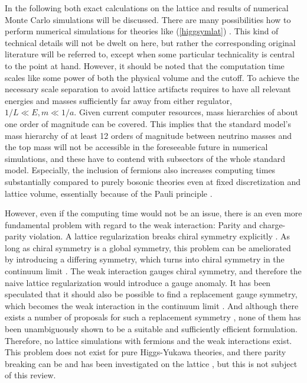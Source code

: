 \documentclass[final,twoside,12pt]{article}
\newcommand*{\pref}[1]{(\ref{#1})}
\newcommand*{\1}{1\!\!\!\bot}
\begin{document}
In the following both exact calculations on the lattice and results of numerical Monte Carlo simulations will be discussed. There are many possibilities how to perform numerical simulations for theories like \pref{higgsymlat} \cite{Montvay:1994cy,DeGrand:2006zz}. This kind of technical details will not be dwelt on here, but rather the corresponding original literature will be referred to, except when some particular technicality is central to the point at hand. However, it should be noted that the computation time scales like some power of both the physical volume and the cutoff. To achieve the necessary scale separation to avoid lattice artifacts requires to have all relevant energies and masses sufficiently far away from either regulator, $1/L\ll E,m\ll 1/a$. Given current computer resources, mass hierarchies of about one order of magnitude can be covered. This implies that the standard model's mass hierarchy of at least 12 orders of magnitude between neutrino masses and the top mass will not be accessible in the foreseeable future in numerical simulations, and these have to contend with subsectors of the whole standard model. Especially, the inclusion of fermions also increases computing times substantially compared to purely bosonic theories even at fixed discretization and lattice volume, essentially because of the Pauli principle \cite{Gattringer:2010zz,DeGrand:2006zz}.

However, even if the computing time would not be an issue, there is an even more fundamental problem with regard to the weak interaction: Parity and charge-parity violation. A lattice regularization breaks chiral symmetry explicitly \cite{Montvay:1994cy,Gattringer:2010zz,DeGrand:2006zz}. As long as chiral symmetry is a global symmetry, this problem can be ameliorated by introducing a differing symmetry, which turns into chiral symmetry in the continuum limit \cite{Gattringer:2010zz,DeGrand:2006zz}. The weak interaction gauges chiral symmetry, and therefore the naive lattice regularization would introduce a gauge anomaly. It has been speculated that it should also be possible to find a replacement gauge symmetry, which becomes the weak interaction in the continuum limit \cite{Hasenfratz:2007dp}. And although there exists a number of proposals for such a replacement symmetry \cite{Grabowska:2015qpk,Gattringer:2008je,Cundy:2010pu,Igarashi:2009kj,Xue:2000du}, none of them has been unambiguously shown to be a suitable and sufficiently efficient formulation. Therefore, no lattice simulations with fermions and the weak interactions exist. This problem does not exist for pure Higgs-Yukawa theories, and there parity breaking can be and has been investigated on the lattice \cite{Fodor:2007fn,Gerhold:2007gx,Gerhold:2010bh,Gerhold:2011mx,Chu:2015nha,Bulava:2012rb}, but this is not subject of this review.
\end{document}
